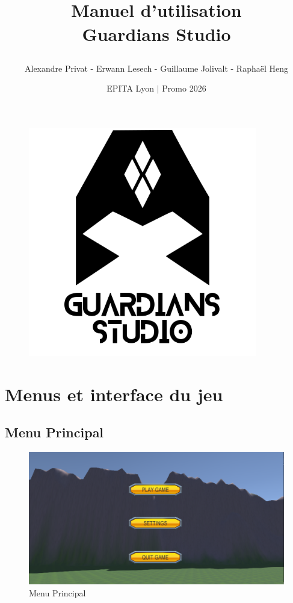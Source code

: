 \documentclass[a4paper, 11pt]{article}
\title{
	\hrulefill 
	\\
	Manuel d'utilisation 
	\\
	\textbf{Guardians Studio}
	
	\hrulefill
}
\date{EPITA Lyon $|$ Promo 2026}
\author{Alexandre Privat - Erwann Lesech - Guillaume Jolivalt - Raphaël Heng}
\begin{document}
	\maketitle
	
	\begin{figure}[ht]
		\centering
		\includegraphics[width=10cm, height=10cm]{images/logo.png}
	\end{figure}
	
	\clearpage
	\tableofcontents
	\clearpage
	
	\section{Menus et interface du jeu}
	\subsection{Menu Principal}
	
	\begin{figure}[!ht]
		\centering
		\includegraphics[scale=0.3]{images/menu_principal.png}
		\caption{Menu Principal}
	\end{figure}
	
\end{document}
